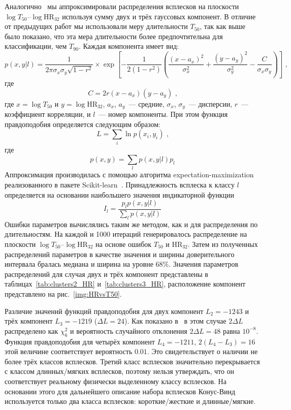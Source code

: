 Аналогично~\citep{Horvath_2006} мы аппроксимировали распределения всплесков на 
плоскости $\log T_{50}\textrm{--}\log \mbox{HR}_{32}$ используя сумму двух и трёх 
гауссовых компонент. В отличие от предыдущих работ мы использовали меру длительности 
$T_{50}$, так как выше было показано, что эта мера длительности более предпочтительна 
для классификации, чем $T_{90}$. Каждая компонента имеет вид: 
\begin{equation}
p(x,y| l) = \frac{1}{2\pi \sigma_x \sigma_y \sqrt{1-r^2}} \times 
\exp\left[ -\frac{1}{2(1-r^2)}\left( \frac{(x-a_x)^2}{\sigma_x^2} + 
\frac{(y-a_y)^2}{\sigma_y^2} -\frac{C}{\sigma_x \sigma_y}\right)\right]\mbox{ ,}
\end{equation}
где
\begin{equation}
C = 2r(x-a_x)(y-a_y)\mbox{ ,} \nonumber
\end{equation}
где $x=\log T_{50}$ и $y=\log \mbox{HR}_{32}$,  $a_x$, $a_y$~--- средние, 
$\sigma_x$, $\sigma_y$~--- дисперсии, $r$~--- коэффициент корреляции, 
и $l$~--- номер компоненты. При этом функция правдоподобия определяется следующим образом:
\begin{equation}
L = \sum_i \ln p(x_i, y_i)\mbox{ ,}
\end{equation}
где
\begin{equation}
p(x,y) = \sum_l  p(x, y|l)p_l \nonumber
\end{equation}
Аппроксимация производилась с помощью алгоритма 
expectation-maximization~\citep{Horvath_2006, Balazs_2003} реализованного в пакете 
Scikit-learn~\citep{scikit-learn}.  Принадлежность всплеска к классу $l$ определяется 
на основании наибольшего значения индикаторной функции
\begin{equation}
I_l =\frac{p_l p(x,y|l)}{\sum_l  p(x, y|l)}
\end{equation}
Ошибки параметров вычислялись таким же методом, как и для распределения по длительностям. 
На каждой и 1000 итераций генерировалось распределение на плоскости  
$\log T_{50}\textrm{--}\log\mbox{HR}_{32}$ на основе ошибок $T_{50}$ и HR$_{32}$. 
Затем из полученных распределений параметров в качестве значения и ширины доверительного 
интервала бралась медиана и ширина на уровне 68\%. Значения параметров распределений 
для случая двух и трёх компонент представлены в таблицах~\ref{tab:clusters2_HR} 
и~\ref{tab:clusters3_HR}, расположение компонент представлено на рис.~\ref{img:HRvsT50}. 

Различие значений функций правдоподобия для двух компонент $L_2 = -1243$ и трёх 
компонент $L_3 = -1219$ ($\Delta L = 24$). Как показано в~\citep{Horvath_2006} 
в этом случае $2\Delta L$ распределено как $\chi^2_6$ и вероятность случайного 
отклонения $2\Delta L = 48$ равна $10^{-8}$. Функция правдоподобия для четырёх 
компонент $L_4 = -1211$, $2(L_4 - L_3) = 16$ этой величине соответствует вероятность $0.01$. 
Это свидетельствует о наличии не более трёх классов всплесков. Третий класс всплесков 
значительно перекрывается с классом длинных/мягких всплесков, поэтому нельзя утверждать, 
что он соответствует реальному физически выделенному классу всплесков. На основании 
этого для дальнейшего описание набора всплесков Конус-Винд используется только 
два класса всплесков: короткие/жесткие и длинные/мягкие.

